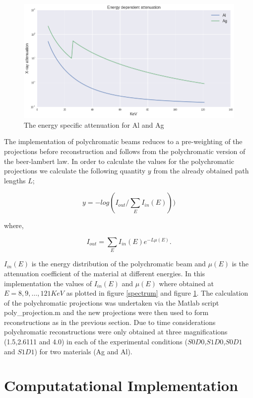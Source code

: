 \documentclass[
  twoside,
  11pt, a4paper,
  footinclude=true,
  headinclude=true,
  cleardoublepage=empty
]{scrbook}
\begin{document}
\begin{figure}[h!]
  \centering
    \includegraphics[width=\textwidth]{code/Polychromatic/Spectrum_Atenuation_Plots_files/Spectrum_Atenuation_Plots_2_0.png}
    \caption{The energy specific attenuation for Al and Ag}
    \label{mu}
\end{figure}


The implementation of polychromatic beams reduces to a pre-weighting of the projections before reconstruction and follows from the polychromatic version of the beer-lambert law. In order to calculate the values for the polychromatic projections we calculate the following quantity $y$ from the already obtained path lengths $L$;

\[
y = -log(I_{out}/\sum_E I_{in}(E)))
\]

where,

\[
I_{out} = \sum_E I_{in}(E) e^{-L \mu(E)}.
\]

$I_{in}(E)$ is the energy distribution of the polychromatic beam and $\mu(E)$ is the attenuation coefficient of the material at different energies. In this implementation the values of $I_{in}(E)$ and $\mu(E)$ where obtained at $E = 8,9,\ldots,121 KeV$ as plotted in figure \ref{spectrum} and figure \ref{mu}. The calculation of the polychromatic projections was undertaken via the Matlab script poly\_projection.m and the new projections were then used to form reconstructions as in the previous section. Due to time considerations polychromatic reconstructions were only obtained at three magnifications (1.5,2.6111 and 4.0) in each of the experimental conditions ($S0D0$,$S1D0$,$S0D1$ and $S1D1$) for two materials (Ag and Al).

\chapter{Computatational Implementation}
\end{document}
